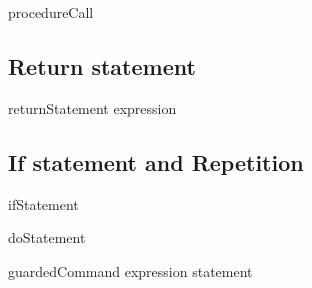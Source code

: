 \bgrm
procedureCall \Derive
   \trm{(}  \trm{)}
\egrm

\subsection{Return statement}
\bgrm
returnStatement \Derive
   expression   
\egrm

\subsection{If statement and Repetition}
\bgrm
ifStatement \Derive
    
\egrm

\bgrm
doStatement \Derive
     
\egrm

\bgrm
guardedCommand \Derive
  \trm{::} expression \trm{=>} statement
\egrm

















